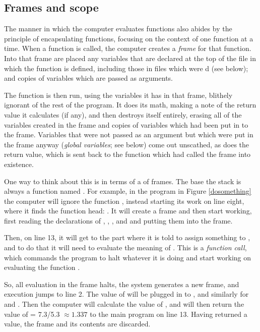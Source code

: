 \subsection{Frames and scope}  
The manner in which the computer evaluates functions also abides by the
principle of encapsulating functions, focusing on the context of one
function at a time. When a function is called, the computer creates a
{\sl frame} for that function. Into that frame are placed any variables
that are declared at the top of the file in which the function is defined,
including those in files which were d (see below); and copies of
variables which are passed as arguments. 

The function is then run, using the variables it has in that frame,
blithely ignorant of the rest of the program. It does its math, making a
note of the return value it calculates (if any), and then destroys itself
entirely, erasing all of the variables created in the frame and copies
of variables which had been put in to the frame. Variables that were not
passed as an argument but which were put in the frame anyway ({\sl global
variables}; see below) come out unscathed, as does the return value, which
is sent back to the function which had called the frame into existence.

\lstset{numbers=left, numberstyle=\scshape}
\lstset{numbers=none}

One way to think about this is in terms of a  of frames. 
The base the stack is always a function named . 
For example, in the program in Figure \ref{dosomething} 
the computer will ignore the function
, instead starting its work on line eight, where it
finds the  function head: .  It will
create a  frame and
then start working, first reading the declarations of ,
, , and  and putting them
into the frame.

Then, on line 13, it will get to the part where it is told to
assign something to , and to do that it will need
to evaluate the meaning of . This is a {\em function call}, which commands the program
to halt whatever it is doing and start working on evaluating the
function . 

So, all evaluation in the  frame halts, 
the system generates a new frame, and execution jumps to 
line 2. The value of 
will be plugged in to , and similarly for  and
. Then the computer will calculate the value of , and will then return the value of  =
7.3/5.3 $\approx 1.337$ to the main program on line 13. Having returned
a value, the  frame and its contents are
discarded.

